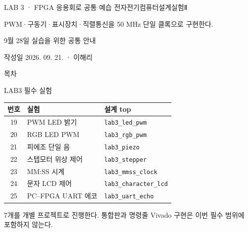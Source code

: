

\renewcommand{\small}{\fontsize{8.7}{10.6}\selectfont}
\setlength{\leftmargini}{1.35em}
\begin{frame}{LAB 3 · FPGA 응용회로 공통 예습}
\small
전자전기컴퓨터설계실험Ⅱ\par\vspace{0.28cm}
PWM·구동기·표시장치·직렬통신을 50 MHz 단일 클록으로 구현한다.\par\vspace{0.28cm}
9월 28일 실습을 위한 공통 안내\par\vspace{0.28cm}작성일 2026. 09. 21. · 이해리
\end{frame}
\begin{frame}[label=lab3-contents]{목차}
\small
{}\par\vspace{0.3cm}
\par\vspace{0.3cm}
\par\vspace{0.3cm}
\par\vspace{0.3cm}
\end{frame}
\begin{frame}[label=scope]{LAB3 필수 실험}
\small
\begin{center}\renewcommand{\arraystretch}{1.25}\begin{tabular}{cll}
번호 & 실험 & 설계 top\\\hline
19 & PWM LED 밝기 & \texttt{lab3\_led\_pwm}\\
20 & RGB LED PWM & \texttt{lab3\_rgb\_pwm}\\
21 & 피에조 단일 음 & \texttt{lab3\_piezo}\\
22 & 스텝모터 위상 제어 & \texttt{lab3\_stepper}\\
23 & MM:SS 시계 & \texttt{lab3\_mmss\_clock}\\
24 & 문자 LCD 제어 & \texttt{lab3\_character\_lcd}\\
25 & PC–FPGA UART 에코 & \texttt{lab3\_uart\_echo}\\
\end{tabular}\end{center}
7개를 개별 프로젝트로 진행한다. 통합판과 명령줄 Vivado 구현은 이번 필수 범위에 포함하지 않는다.
\end{frame}
